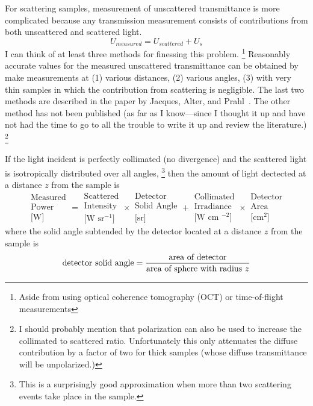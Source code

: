 \documentclass{article}
\begin{document}
For scattering samples, measurement of unscattered transmittance is more
complicated because any transmission measurement 
consists of contributions from both unscattered and
scattered light.
$$
U_{\mathit{measured}} = U_{\mathit{scattered}} + U_s
$$
I can think of at least three methods for finessing this problem.%
\footnote{Aside from using optical coherence tomography (OCT) or
time-of-flight measurements}
Reasonably accurate values for the measured unscattered transmittance
can be obtained by make measurements at (1) various distances, (2) various
angles, (3) with very thin samples in
which the contribution from scattering is negligible.  The last two
methods are described in the paper by Jacques, Alter, and Prahl~\cite{jacques87b}.
The other method has not been
published (as far as I know---since I thought it up and have not had the
time to go to all the trouble to write it up and review the literature.)%
\footnote{I should probably mention that polarization can also be used to increase
the collimated to scattered ratio.  Unfortunately this only attenuates the
diffuse contribution by a factor of two for thick samples (whose diffuse
transmittance will be unpolarized.)}

If the light incident is perfectly collimated (no divergence) and the
scattered light is isotropically distributed over all angles,%
\footnote{This is a surprisingly good approximation when
more than two scattering events take place in the sample.} then the
amount of light dectected at a distance $z$ from the sample is
\def\sa{\begin{array}{c}}
\def\ea{\end{array} }
$$
\sa\mbox{Measured}   \\ \mbox{Power}      \\ \mbox{[W]}           \ea =
\sa\mbox{Scattered}  \\ \mbox{Intensity}  \\ \mbox{[W sr$^{-1}$]} \ea \times
\sa\mbox{Detector}   \\ \mbox{Solid Angle}\\ \mbox{[sr]}          \ea +
\sa\mbox{Collimated} \\ \mbox{Irradiance} \\ \mbox{[W cm $^{-2}$]}\ea \times
\sa\mbox{Detector}   \\ \mbox{Area}\\ \mbox{[cm$^2$]}      \ea
$$
where the
solid angle subtended by the detector located at a distance $z$ from the
sample is
$$
\mbox{detector solid angle}=
	{\mbox{area of detector}\over\mbox{area of sphere with radius $z$}}
$$
\end{document}
